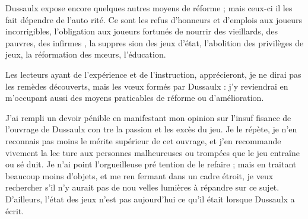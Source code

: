 Dussaulx expose encore quelques
autres moyens de réforme ; mais
ceux-ci il les fait dépendre de l'auto%
rité. Ce sont les refus d'honneurs et
d'emplois aux joueurs incorrigibles,
l'obligation aux joueurs fortunés de
nourrir des vieillards, des pauvres,
des infirmes , la suppres%
sion des jeux d'état, l'abolition des
privilèges de jeux, la réformation des
mœurs, l'éducation.

Les lecteurs ayant de l'expérience
et de l'instruction, apprécieront, je
ne dirai pas les remèdes découverts,
mais les vœux formés par Dussaulx :
j'y reviendrai en m'occupant aussi
des moyens praticables de réforme
ou d'amélioration.

J'ai rempli un devoir pénible en 
manifestant mon opinion sur l'insuf%
fisance de l'ouvrage de Dussaulx con%
tre la passion et les excès du jeu. Je
le répète, je n'en reconnais pas moins
le mérite supérieur de cet ouvrage,
et j'en recommande vivement la lec%
ture aux personnes malheureuses ou
trompées que le jeu entraîne ou sé%
duit. Je n'ai point l'orgueilleuse pré%
tention de le refaire ; mais en traitant
beaucoup moins d'objets, et me ren%
fermant dans un cadre étroit, je veux
rechercher s'il n'y aurait pas de nou%
velles lumières à répandre sur ce
sujet. D'ailleurs, l'état des jeux n'est
pas aujourd'hui ce qu'il était lorsque
Dussaulx a écrit.
